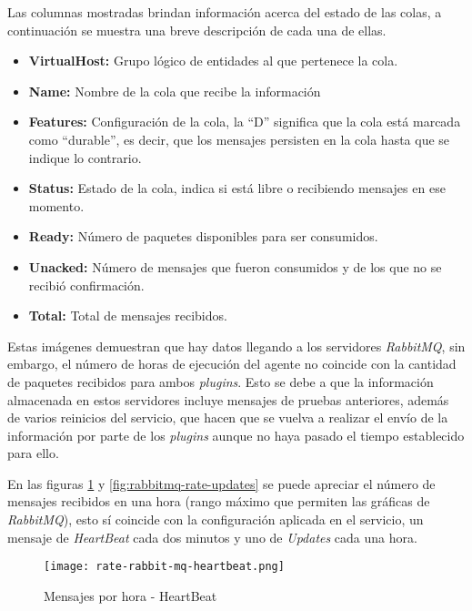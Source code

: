         Las columnas mostradas brindan información acerca del estado de las colas, a continuación se muestra una breve descripción de cada una de ellas.
        
        \begin{itemize}
            \setlength\itemsep{2em}
            \item \textbf{VirtualHost:} Grupo lógico de entidades al que pertenece la cola. \cite{virtualhost}
            \item \textbf{Name:} Nombre de la cola que recibe la información
            \item \textbf{Features:} Configuración de la cola, la ``D'' significa que la cola está marcada como ``durable'', es decir, que los mensajes persisten en la cola hasta que se indique lo contrario.
            \item \textbf{Status:} Estado de la cola, indica si está libre o recibiendo mensajes en ese momento.
            \item \textbf{Ready:} Número de paquetes disponibles para ser consumidos.
            \item \textbf{Unacked:} Número de mensajes que fueron consumidos y de los que no se recibió confirmación.
            \item \textbf{Total:} Total de mensajes recibidos.
        \end{itemize}{}
        
        Estas imágenes demuestran que hay datos llegando a los servidores \textit{RabbitMQ}, sin embargo, el número de horas de ejecución del agente no coincide con la cantidad de paquetes recibidos para ambos \textit{plugins}. Esto se debe a que la información almacenada en estos servidores incluye mensajes de pruebas anteriores, además de varios reinicios del servicio, que hacen que se vuelva a realizar el envío de la información por parte de los \textit{plugins} aunque no haya pasado el tiempo establecido para ello.
        
        En las figuras \ref{fig:rabbitmq-rate-heartbeat} y \ref{fig:rabbitmq-rate-updates} se puede apreciar el número de mensajes recibidos en una hora (rango máximo que permiten las gráficas de \textit{RabbitMQ}), esto sí coincide con la configuración aplicada en el servicio, un mensaje de \textit{HeartBeat} cada dos minutos y uno de \textit{Updates} cada una hora.
        
        \begin{figure}[H]
        \centering
            \texttt{[image: rate-rabbit-mq-heartbeat.png]}
            \caption{Mensajes por hora - HeartBeat}
            \label{fig:rabbitmq-rate-heartbeat}
        \end{figure}
        
